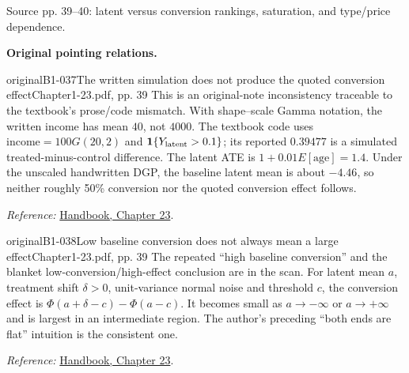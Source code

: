 {\begin{center}
\begin{tikzpicture}[>=Stealth, font=\small, line width=.65pt]
\end{tikzpicture}
\par{\small Source pp. 39--40: latent versus conversion rankings, saturation, and type/price dependence.}
\end{center}
\par{}\smallskip\textbf{Original pointing relations.}\par\smallskip
{}
\begin{reviewnote}{original}{B1-037}{The written simulation does not produce the quoted conversion effect}{Chapter1-23.pdf, pp. 39}
This is an original-note inconsistency traceable to the textbook's prose/code mismatch. With shape--scale Gamma notation, the written income has mean $40$, not $4000$. The textbook code uses $\mathrm{income}=100G(20,2)$ and $\mathbf1\{Y_{\rm latent}>0.1\}$; its reported $0.39477$ is a simulated treated-minus-control difference. The latent ATE is $1+0.01E[\mathrm{age}]=1.4$. Under the unscaled handwritten DGP, the baseline latent mean is about $-4.46$, so neither roughly 50\% conversion nor the quoted conversion effect follows.
\par\smallskip\textit{Reference:} \href{https://matheusfacure.github.io/python-causality-handbook/23-Challenges-with-Effect-Heterogeneity-and-Nonlinearity.html}{Handbook, Chapter 23}.
\end{reviewnote}

\begin{reviewnote}{original}{B1-038}{Low baseline conversion does not always mean a large effect}{Chapter1-23.pdf, pp. 39}
The repeated ``high baseline conversion'' and the blanket low-conversion/high-effect conclusion are in the scan. For latent mean $a$, treatment shift $\delta>0$, unit-variance normal noise and threshold $c$, the conversion effect is $\Phi(a+\delta-c)-\Phi(a-c)$. It becomes small as $a\to-\infty$ or $a\to+\infty$ and is largest in an intermediate region. The author's preceding ``both ends are flat'' intuition is the consistent one.
\par\smallskip\textit{Reference:} \href{https://matheusfacure.github.io/python-causality-handbook/23-Challenges-with-Effect-Heterogeneity-and-Nonlinearity.html}{Handbook, Chapter 23}.
\end{reviewnote}

}
